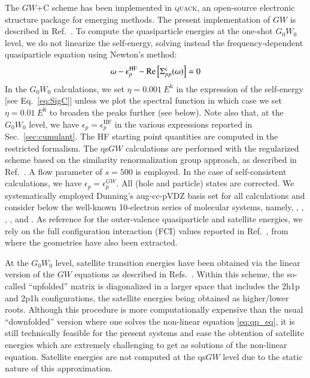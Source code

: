 \documentclass[aip,jcp,reprint,noshowkeys,superscriptaddress]{revtex4-2}
\newcommand{\HF}{\text{HF}}
\newcommand{\GW}{\text{$GW$}}
\newcommand{\co}{\text{c}}
\newcommand{\eps}{\epsilon}
\newcommand{\Sig}{\Sigma}
\begin{document}
The $GW$+C scheme has been implemented in \textsc{quack}, \cite{quack} an open-source electronic structure package for emerging methods.
The present implementation of $GW$ is described in Ref.~.
To compute the quasiparticle energies at the one-shot $G_0W_0$ level, we do not linearize the self-energy, solving instead the frequency-dependent quasiparticle equation using Newton's method:
\begin{equation} \label{eq:qp_eq}
	\omega - \eps_p^\HF - \Re\qty[\Sig_{pp}^{\co}(\omega)] = 0
\end{equation}
In the $G_0W_0$ calculations, we set $\eta = \SI{0.001}{\hartree}$ in the expression of the self-energy [see Eq.~\eqref{eq:SigC}] unless we plot the spectral function in which case we set $\eta = \SI{0.01}{\hartree}$ to broaden the peaks further (see below). Note also that, at the $G_0W_0$ level, we have $\eps_p = \eps_p^\HF$ in the various expressions reported in Sec.~\ref{sec:cumulant}.
The HF starting point quantities are computed in the restricted formalism.
The qs$GW$ calculations are performed with the regularized scheme based on the similarity renormalization group approach, as described in Ref.~. A flow parameter of $s = 500$ is employed. In the case of self-consistent calculations, we have $\eps_p = \eps_p^\GW$.
All (hole and particle) states are corrected.
We systematically employed Dunning's aug-cc-pVDZ basis set for all calculations and consider below the well-known 10-electron series of molecular systems, namely, , , , , and .
As reference for the outer-valence quasiparticle and satellite energies, we rely on the full configuration interaction (FCI) values reported in Ref.~, from where the geometries have also been extracted.

At the $G_0W_0$ level, satellite transition energies have been obtained via the linear version of the $GW$ equations as described in Refs.~. Within this scheme,  the so-called ``upfolded'' matrix is diagonalized in a larger space that includes the 2h1p and 2p1h configurations, the satellite energies being obtained as higher/lower roots.  
Although this procedure is more computationally expensive than the usual ``downfolded'' version where one solves the non-linear equation \eqref{eq:qp_eq}, it is still technically feasible for the present systems and ease the obtention of satellite energies which are extremely challenging to get as solutions of the non-linear equation. Satellite energies are not computed at the qs$GW$ level due to the static nature of this approximation.
\end{document}
